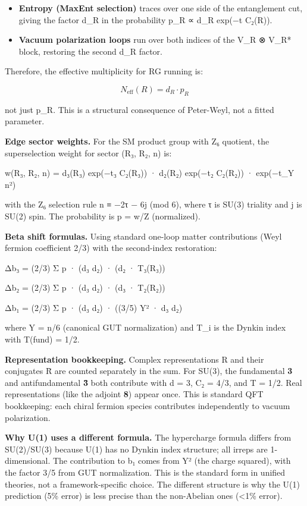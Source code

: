 \begin{itemize}
\item
  \textbf{Entropy (MaxEnt selection)} traces over one side of the entanglement cut, giving the factor d\_R in the probability p\_R ∝ d\_R exp(−t C₂(R)).
\item
  \textbf{Vacuum polarization loops} run over both indices of the V\_R ⊗ V\_R* block, restoring the second d\_R factor.
\end{itemize}

Therefore, the effective multiplicity for RG running is:

\[
N_{\text{eff}}(R) = d_R \cdot p_R
\]

not just p\_R. This is a structural consequence of Peter-Weyl, not a fitted parameter.

\textbf{Edge sector weights.} For the SM product group with Z₆ quotient, the superselection weight for sector (R₃, R₂, n) is:

w(R₃, R₂, n) = d₃(R₃) exp(−t₃ C₂(R₃)) · d₂(R₂) exp(−t₂ C₂(R₂)) · exp(−t\_Y n²)

with the Z₆ selection rule n ≡ −2τ − 6j (mod 6), where τ is SU(3) triality and j is SU(2) spin. The probability is p = w/Z (normalized).

\textbf{Beta shift formulas.} Using standard one-loop matter contributions (Weyl fermion coefficient 2/3) with the second-index restoration:

Δb₃ = (2/3) Σ p · (d₃ d₂) · (d₂ · T₃(R₃))

Δb₂ = (2/3) Σ p · (d₃ d₂) · (d₃ · T₂(R₂))

Δb₁ = (2/3) Σ p · (d₃ d₂) · ((3/5) Y² · d₃ d₂)

where Y = n/6 (canonical GUT normalization) and T\_i is the Dynkin index with T(fund) = 1/2.

\textbf{Representation bookkeeping.} Complex representations R and their conjugates \={R} are counted separately in the sum. For SU(3), the fundamental \textbf{3} and antifundamental \textbf{\={3}} both contribute with d = 3, C₂ = 4/3, and T = 1/2. Real representations (like the adjoint \textbf{8}) appear once. This is standard QFT bookkeeping: each chiral fermion species contributes independently to vacuum polarization.

\textbf{Why U(1) uses a different formula.} The hypercharge formula differs from SU(2)/SU(3) because U(1) has no Dynkin index structure; all irreps are 1-dimensional. The contribution to b₁ comes from Y² (the charge squared), with the factor 3/5 from GUT normalization. This is the standard form in unified theories, not a framework-specific choice. The different structure is why the U(1) prediction (5\% error) is less precise than the non-Abelian ones (\textless1\% error).

